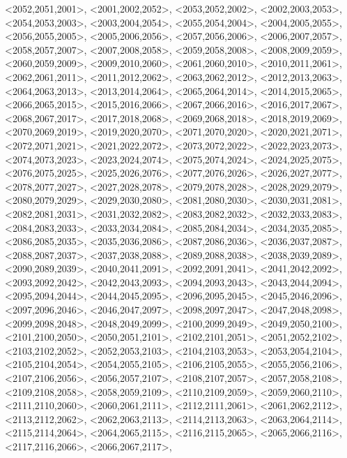 \documentclass[a4paper,10pt]{article}
\begin{document}
\begin{eulernotebook}
\begin{euleroutput}
  <2052,2051,2001>,
  <2001,2002,2052>,
  <2053,2052,2002>,
  <2002,2003,2053>,
  <2054,2053,2003>,
  <2003,2004,2054>,
  <2055,2054,2004>,
  <2004,2005,2055>,
  <2056,2055,2005>,
  <2005,2006,2056>,
  <2057,2056,2006>,
  <2006,2007,2057>,
  <2058,2057,2007>,
  <2007,2008,2058>,
  <2059,2058,2008>,
  <2008,2009,2059>,
  <2060,2059,2009>,
  <2009,2010,2060>,
  <2061,2060,2010>,
  <2010,2011,2061>,
  <2062,2061,2011>,
  <2011,2012,2062>,
  <2063,2062,2012>,
  <2012,2013,2063>,
  <2064,2063,2013>,
  <2013,2014,2064>,
  <2065,2064,2014>,
  <2014,2015,2065>,
  <2066,2065,2015>,
  <2015,2016,2066>,
  <2067,2066,2016>,
  <2016,2017,2067>,
  <2068,2067,2017>,
  <2017,2018,2068>,
  <2069,2068,2018>,
  <2018,2019,2069>,
  <2070,2069,2019>,
  <2019,2020,2070>,
  <2071,2070,2020>,
  <2020,2021,2071>,
  <2072,2071,2021>,
  <2021,2022,2072>,
  <2073,2072,2022>,
  <2022,2023,2073>,
  <2074,2073,2023>,
  <2023,2024,2074>,
  <2075,2074,2024>,
  <2024,2025,2075>,
  <2076,2075,2025>,
  <2025,2026,2076>,
  <2077,2076,2026>,
  <2026,2027,2077>,
  <2078,2077,2027>,
  <2027,2028,2078>,
  <2079,2078,2028>,
  <2028,2029,2079>,
  <2080,2079,2029>,
  <2029,2030,2080>,
  <2081,2080,2030>,
  <2030,2031,2081>,
  <2082,2081,2031>,
  <2031,2032,2082>,
  <2083,2082,2032>,
  <2032,2033,2083>,
  <2084,2083,2033>,
  <2033,2034,2084>,
  <2085,2084,2034>,
  <2034,2035,2085>,
  <2086,2085,2035>,
  <2035,2036,2086>,
  <2087,2086,2036>,
  <2036,2037,2087>,
  <2088,2087,2037>,
  <2037,2038,2088>,
  <2089,2088,2038>,
  <2038,2039,2089>,
  <2090,2089,2039>,
  <2040,2041,2091>,
  <2092,2091,2041>,
  <2041,2042,2092>,
  <2093,2092,2042>,
  <2042,2043,2093>,
  <2094,2093,2043>,
  <2043,2044,2094>,
  <2095,2094,2044>,
  <2044,2045,2095>,
  <2096,2095,2045>,
  <2045,2046,2096>,
  <2097,2096,2046>,
  <2046,2047,2097>,
  <2098,2097,2047>,
  <2047,2048,2098>,
  <2099,2098,2048>,
  <2048,2049,2099>,
  <2100,2099,2049>,
  <2049,2050,2100>,
  <2101,2100,2050>,
  <2050,2051,2101>,
  <2102,2101,2051>,
  <2051,2052,2102>,
  <2103,2102,2052>,
  <2052,2053,2103>,
  <2104,2103,2053>,
  <2053,2054,2104>,
  <2105,2104,2054>,
  <2054,2055,2105>,
  <2106,2105,2055>,
  <2055,2056,2106>,
  <2107,2106,2056>,
  <2056,2057,2107>,
  <2108,2107,2057>,
  <2057,2058,2108>,
  <2109,2108,2058>,
  <2058,2059,2109>,
  <2110,2109,2059>,
  <2059,2060,2110>,
  <2111,2110,2060>,
  <2060,2061,2111>,
  <2112,2111,2061>,
  <2061,2062,2112>,
  <2113,2112,2062>,
  <2062,2063,2113>,
  <2114,2113,2063>,
  <2063,2064,2114>,
  <2115,2114,2064>,
  <2064,2065,2115>,
  <2116,2115,2065>,
  <2065,2066,2116>,
  <2117,2116,2066>,
  <2066,2067,2117>,

\end{euleroutput}
\end{eulernotebook}
\end{document}
